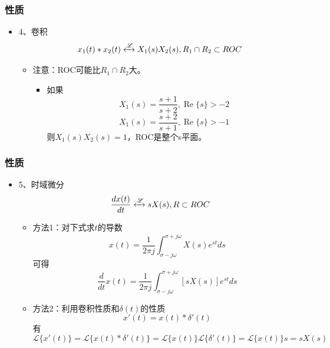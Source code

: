 \documentclass[CJKutf8,dvipsnames,table]{beamer}
\begin{document}
\begin{CJK*}{UTF8}{song}
  \begin{frame}
    \frametitle{性质}
    \begin{itemize}
    \item 4、卷积 \\
    \[
    x_1(t) \ast x_2(t) \xleftrightarrow{\mathscr{L}} X_1(s)X_2(s), R_1 \cap R_2 \subset ROC 
    \]
    	\begin{itemize}
   		\item 注意：ROC可能比$R_1 \cap R_2$大。
			\begin{itemize}
			\item 如果
			\[
			X_1(s)=\frac{s+1}{s+2}, \operatorname{Re}\{s\} > -2
			\]
			\[
			X_1(s)=\frac{s+2}{s+1}, \operatorname{Re}\{s\} > -1
			\]
			则$X_1(s)X_2(s)=1$，ROC是整个s平面。
			\end{itemize}
    	\end{itemize}
    \end{itemize}
  \end{frame}
   
  \begin{frame}
    \frametitle{性质}
    \begin{itemize}
    \item 5、时域微分 \\
    \[
    \frac{dx(t)}{dt} \xleftrightarrow{\mathscr{L}} sX(s), R \subset ROC 
    \]
    	\begin{itemize}
		\item 方法1：对下式求$t$的导数
		\[
				x(t) = \frac{1}{2\pi j}\int_{\sigma-j\omega}^{\sigma+j\omega} X(s)e^{st}ds 	
		\]
		可得
		\[
				\frac{d}{dt}x(t) = \frac{1}{2\pi j}\int_{\sigma-j\omega}^{\sigma+j\omega} [sX(s)]e^{st}ds 	
		\]
		\item 方法2：利用卷积性质和$\delta(t)$的性质
		\[
			x'(t) = x(t) \ast \delta'(t) %
		\]
		有
		\[
		\mathscr{L}\{x'(t)\} = \mathscr{L}\{x(t) \ast \delta'(t) \} = \mathscr{L}\{x(t)\} \mathscr{L}\{\delta'(t)\} = \mathscr{L}\{x(t)\}s = sX(s)
		\]
		\end{itemize}
    \end{itemize}
  \end{frame}


\end{CJK*}
\end{document}
